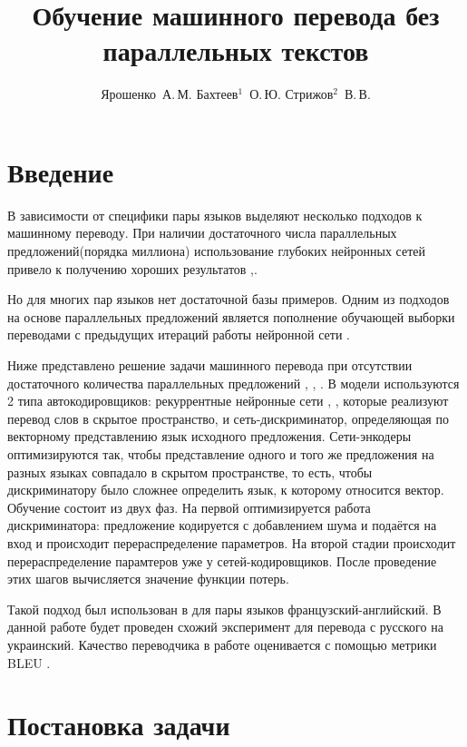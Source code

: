 \documentclass[12pt,twoside]{article}
\title
    [Обучение машинного перевода без параллельных текстов] %
    {Обучение машинного перевода без параллельных текстов}
\author
    [Ярошенко~А.\,М. Бахтеев$^1$~О.\,Ю.  Стрижов$^2$~В.\,В.] %
{Ярошенко~А.\,М. Бахтеев$^1$~О.\,Ю.  Стрижов$^2$~В.\,В.} %
[Ярошенко~А.\,М. Бахтеев$^1$~О.\,Ю.  Стрижов$^2$~В.\,В.] %
\begin{document}
\maketitle

\section{Введение}

В зависимости от специфики пары языков выделяют несколько подходов к машинному переводу. При наличии достаточного числа параллельных предложений(порядка миллиона) использование глубоких нейронных сетей привело к получению хороших результатов \cite{zou2013bilingual},\cite{cho2014properties}. 

Но для многих пар языков нет достаточной базы примеров. Одним из подходов на основе параллельных предложений является пополнение обучающей выборки переводами с предыдущих итераций работы нейронной сети \cite{bertoldi2009domain}. 

Ниже представлено решение задачи машинного перевода при отсутствии достаточного количества параллельных предложений \cite{wu2016google}, \cite{sutskever2014sequence}, \cite{bahdanau2014neural}. В модели используются 2 типа автокодировщиков: рекуррентные нейронные сети \cite{gers1999learning}, \cite{graves2005framewise}, которые реализуют перевод слов в скрытое пространство, и сеть-дискриминатор, определяющая по векторному представлению язык исходного предложения. Сети-энкодеры оптимизируются так, чтобы представление одного и того же предложения на разных языках совпадало в скрытом пространстве, то есть, чтобы дискриминатору было сложнее определить язык, к которому относится вектор. Обучение состоит из двух фаз. На первой оптимизируется работа дискриминатора: предложение кодируется с добавлением шума \cite{kimimproving} и подаётся на вход и происходит перераспределение параметров. На второй стадии происходит перераспределение парамтеров уже у сетей-кодировщиков. После проведение этих шагов вычисляется значение функции потерь. 
 
Такой подход был использован в \cite{lample2017unsupervised} для пары языков французский-английский. В данной работе будет проведен схожий эксперимент для перевода с русского на украинский. Качество переводчика в работе оценивается с помощью метрики BLEU \cite{papineni2002bleu}.

\section{Постановка задачи}
\end{document}
